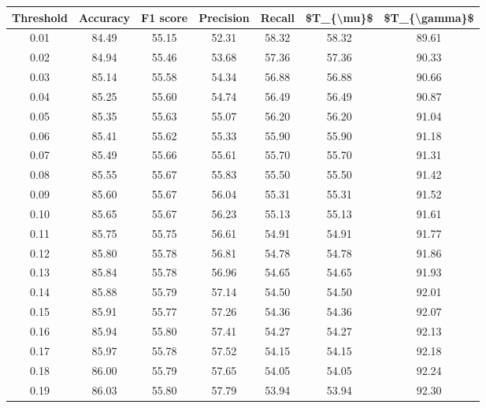 \begin{tabular}{|c|c|c|c|c|c|c|}
\hline
 Threshold &  Accuracy &  F1 score &  Precision &  Recall &  \$T\_\{\textbackslash mu\}\$ &  \$T\_\{\textbackslash gamma\}\$ \\
\hline
      0.01 &     84.49 &     55.15 &      52.31 &   58.32 &      58.32 &         89.61 \\
      0.02 &     84.94 &     55.46 &      53.68 &   57.36 &      57.36 &         90.33 \\
      0.03 &     85.14 &     55.58 &      54.34 &   56.88 &      56.88 &         90.66 \\
      0.04 &     85.25 &     55.60 &      54.74 &   56.49 &      56.49 &         90.87 \\
      0.05 &     85.35 &     55.63 &      55.07 &   56.20 &      56.20 &         91.04 \\
      0.06 &     85.41 &     55.62 &      55.33 &   55.90 &      55.90 &         91.18 \\
      0.07 &     85.49 &     55.66 &      55.61 &   55.70 &      55.70 &         91.31 \\
      0.08 &     85.55 &     55.67 &      55.83 &   55.50 &      55.50 &         91.42 \\
      0.09 &     85.60 &     55.67 &      56.04 &   55.31 &      55.31 &         91.52 \\
      0.10 &     85.65 &     55.67 &      56.23 &   55.13 &      55.13 &         91.61 \\
      0.11 &     85.75 &     55.75 &      56.61 &   54.91 &      54.91 &         91.77 \\
      0.12 &     85.80 &     55.78 &      56.81 &   54.78 &      54.78 &         91.86 \\
      0.13 &     85.84 &     55.78 &      56.96 &   54.65 &      54.65 &         91.93 \\
      0.14 &     85.88 &     55.79 &      57.14 &   54.50 &      54.50 &         92.01 \\
      0.15 &     85.91 &     55.77 &      57.26 &   54.36 &      54.36 &         92.07 \\
      0.16 &     85.94 &     55.80 &      57.41 &   54.27 &      54.27 &         92.13 \\
      0.17 &     85.97 &     55.78 &      57.52 &   54.15 &      54.15 &         92.18 \\
      0.18 &     86.00 &     55.79 &      57.65 &   54.05 &      54.05 &         92.24 \\
      0.19 &     86.03 &     55.80 &      57.79 &   53.94 &      53.94 &         92.30 \\

\end{tabular}
